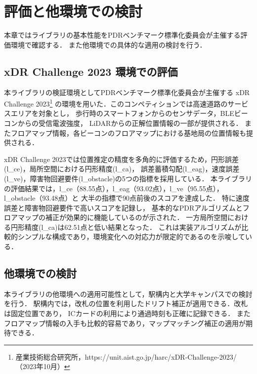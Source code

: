 \documentclass[a4paper, 10pt, twocolumn]{jarticle}
\begin{document}
\section{評価と他環境での検討}

本章ではライブラリの基本性能をPDRベンチマーク標準化委員会が主催する評価環境で確認する．
また他環境での具体的な適用の検討を行う．


\subsection{xDR Challenge 2023 環境での評価}

本ライブラリの検証環境としてPDRベンチマーク標準化委員会が主催する
xDR Challenge 2023\footnote{産業技術総合研究所，https://unit.aist.go.jp/harc/xDR-Challenge-2023/（2023年10月）}
の環境を用いた．このコンペティションでは高速道路のサービスエリアを対象とし，
歩行時のスマートフォンからのセンサデータ，BLEビーコンからの受信電波強度，
LiDARからの正解位置情報の一部が提供される．
またフロアマップ情報，各ビーコンのフロアマップにおける基地局の位置情報も提供される．

xDR Challenge 2023では位置推定の精度を多角的に評価するため，円形誤差(l\_ce)，局所空間における円形精度(l\_ca)，
誤差蓄積勾配(l\_eag)，速度誤差(l\_ve)，障害物回避要件(l\_obstacle)の5つの指標を採用している．
本ライブラリの評価結果では，l\_ce（88.55点），l\_eag（93.02点），l\_ve（95.55点），l\_obstacle（93.48点）と
大半の指標で90点前後のスコアを達成した．
特に速度誤差と障害物回避要件で高いスコアを記録し，
基本的なPDRアルゴリズムとフロアマップの補正が効果的に機能しているのが示された．
一方局所空間における円形精度(l\_ca)は62.51点と低い結果となった．
これは実装アルゴリズムが比較的シンプルな構成であり，環境変化への対応力が限定的であるのを示唆している．


\subsection{他環境での検討}
本ライブラリの他環境への適用可能性として，駅構内と大学キャンパスでの検討を行う．
駅構内では，改札の位置を利用したドリフト補正が適用できる．改札は固定位置であり，
ICカードの利用により通過時刻も正確に記録できる．
またフロアマップ情報の入手も比較的容易であり，マップマッチング補正の適用が期待できる．
\end{document}
